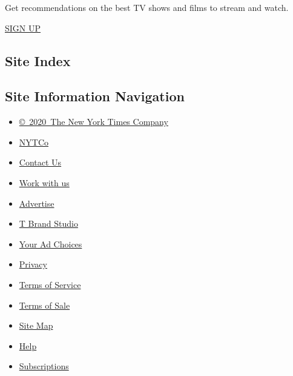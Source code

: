 Get recommendations on the best TV shows and films to stream and watch.

\href{/newsletters/signup/WG}{SIGN UP}

\hypertarget{site-index}{%
\subsection{Site Index}\label{site-index}}

\hypertarget{site-information-navigation}{%
\subsection{Site Information
Navigation}\label{site-information-navigation}}

\begin{itemize}
\tightlist
\item
  \href{https://help.nytimes.com/hc/en-us/articles/115014792127-Copyright-notice}{©~2020~The
  New York Times Company}
\end{itemize}

\begin{itemize}
\tightlist
\item
  \href{https://www.nytco.com/}{NYTCo}
\item
  \href{https://help.nytimes.com/hc/en-us/articles/115015385887-Contact-Us}{Contact
  Us}
\item
  \href{https://www.nytco.com/careers/}{Work with us}
\item
  \href{https://nytmediakit.com/}{Advertise}
\item
  \href{http://www.tbrandstudio.com/}{T Brand Studio}
\item
  \href{https://www.nytimes.com/privacy/cookie-policy\#how-do-i-manage-trackers}{Your
  Ad Choices}
\item
  \href{https://www.nytimes.com/privacy}{Privacy}
\item
  \href{https://help.nytimes.com/hc/en-us/articles/115014893428-Terms-of-service}{Terms
  of Service}
\item
  \href{https://help.nytimes.com/hc/en-us/articles/115014893968-Terms-of-sale}{Terms
  of Sale}
\item
  \href{https://spiderbites.nytimes.com}{Site Map}
\item
  \href{https://help.nytimes.com/hc/en-us}{Help}
\item
  \href{https://www.nytimes.com/subscription?campaignId=37WXW}{Subscriptions}
\end{itemize}
